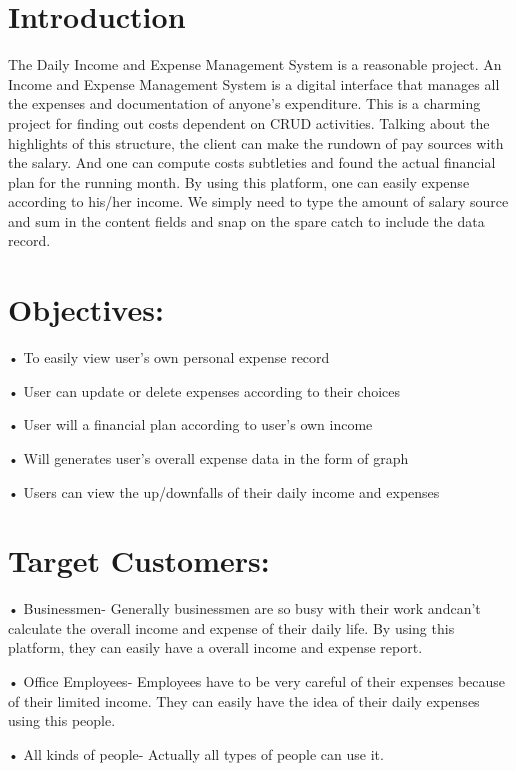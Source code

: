 \documentclass[12pt]{article}
\begin{document}



\section*{Introduction}

\par
The Daily Income and Expense Management System is a reasonable project. An Income and Expense Management System is a digital interface that manages all the expenses and documentation of anyone’s expenditure. This is a charming project for finding out costs dependent on CRUD activities. Talking about the highlights of this structure, the client can make the rundown of pay sources with the salary. And one can compute costs subtleties and found the actual financial plan for the running month. By using this platform, one can easily expense according to his/her income. We simply need to type the amount of salary source and sum in the content fields and snap on the spare catch to include the data record.  
\vspace{0.5cm}
\section*{Objectives:}
\hspace{0.6cm}•	To easily view user’s own personal expense record \par
\vspace{0.5cm}
•	User can update or delete expenses according to their choices \par
\vspace{0.5cm}
•	User will a financial plan according to user’s own income \par
\vspace{0.5cm}
•	Will generates user’s overall expense data in the form of graph \par
\vspace{0.5cm}
•	Users can view the up/downfalls of their daily income and expenses \par

\section*{Target Customers:}
\par
\hspace{0.6cm}•	Businessmen- Generally businessmen are so busy with their work    and\hspace{0.6cm}can’t calculate the overall income and expense of their daily   life. By using \hspace{0.6cm}this platform, they can easily have a overall       income and expense report.
\par
\vspace{0.5cm}
•	Office Employees- Employees have to be very careful of their expenses because of their limited income. They can easily have the idea of their daily expenses using this people.
\vspace{0.5cm}
\par
•	All kinds of people- Actually all types of people can use it.
\end{document}
